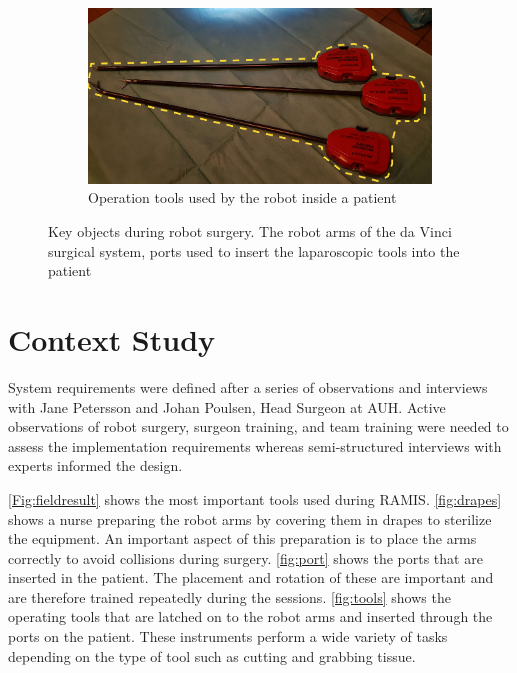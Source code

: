 \documentclass[conference]{IEEEtran}
\begin{document}
\begin{figure}
	\begin{subfigure}[b]{0.48\textwidth}
		\includegraphics[width=\textwidth]{Figures/tools.pdf}
		\caption{Operation tools used by the robot inside a patient}
		\label{fig:tools}
	\end{subfigure}
	\caption{Key objects during robot surgery. The robot arms of the da Vinci surgical system, ports used to insert the laparoscopic tools into the patient}
	\label{Fig:fieldresult}
\end{figure}

\section{Context Study}
System requirements were defined after a series of observations and interviews with Jane Petersson and Johan Poulsen, Head Surgeon at AUH. Active observations of robot surgery, surgeon training, and team training were needed to assess the implementation requirements whereas semi-structured interviews with experts informed the design. 

\autoref{Fig:fieldresult} shows the most important tools used during RAMIS. \autoref{fig:drapes} shows a nurse preparing the robot arms by covering them in drapes to sterilize the equipment. An important aspect of this preparation is to place the arms correctly to avoid collisions during surgery. \autoref{fig:port} shows the ports that are inserted in the patient. The placement and rotation of these are important and are therefore trained repeatedly during the sessions. \autoref{fig:tools} shows the operating tools that are latched on to the robot arms and inserted through the ports on the patient. These instruments perform a wide variety of tasks depending on the type of tool such as cutting and grabbing tissue.
\end{document}
